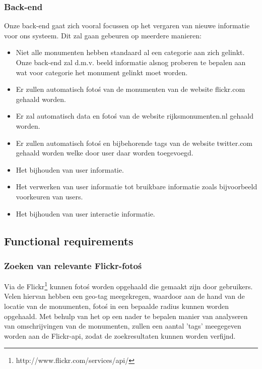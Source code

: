 \documentclass[a4paper,10pt]{article}
\begin{document}
		\subsubsection{Back-end}
			Onze back-end gaat zich vooral focussen op het vergaren van nieuwe informatie voor ons systeem. Dit zal gaan gebeuren op meerdere manieren:
			\begin{itemize}
				\item Niet alle monumenten hebben standaard al een categorie aan zich gelinkt. Onze back-end zal d.m.v. beeld informatie alsnog proberen te bepalen aan wat voor categorie het monument gelinkt moet worden.
				\item Er zullen automatisch foto\'s van de monumenten van de website flickr.com gehaald worden.
				\item Er zal automatisch data en foto\'s van de website rijksmonumenten.nl gehaald worden.
				\item Er zullen automatisch foto\'s en bijbehorende tags van de website twitter.com gehaald worden welke door user daar worden toegevoegd.
				\item Het bijhouden van user informatie.
				\item Het verwerken van user informatie tot bruikbare informatie zoals bijvoorbeeld voorkeuren van users.
				\item Het bijhouden van user interactie informatie.
			\end{itemize}
	
		\subsection{Functional requirements}
			\subsubsection{Zoeken van relevante Flickr-foto\'s}
			Via de Flickr\footnote{http://www.flickr.com/services/api/} kunnen foto\'s worden opgehaald die gemaakt zijn door gebruikers. Velen hiervan hebben een geo-tag meegekregen, waardoor aan de hand van de locatie van de monumenten, foto\'s in een bepaalde radius kunnen worden opgehaald. Met behulp van het op een nader te bepalen manier van analyseren van omschrijvingen van de monumenten, zullen een aantal 'tags' meegegeven worden aan de Flickr-api, zodat de zoekresultaten kunnen worden verfijnd.
			
\end{document}
